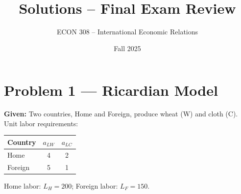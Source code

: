 \documentclass[12pt]{article}
\title{Solutions -- Final Exam Review}
\author{ECON 308 -- International Economic Relations}
\date{Fall 2025}
\begin{document}
\maketitle

\section*{Problem 1 — Ricardian Model}

\textbf{Given:} Two countries, Home and Foreign, produce wheat (W) and cloth (C).  
Unit labor requirements:

\begin{center}
\begin{tabular}{lcc}
\toprule
Country & $a_{LW}$ & $a_{LC}$ \\
\midrule
Home    & 4         & 2        \\
Foreign & 5         & 1        \\
\bottomrule
\end{tabular}
\end{center}

Home labor: $L_H = 200$; Foreign labor: $L_F = 150$.
\end{document}
